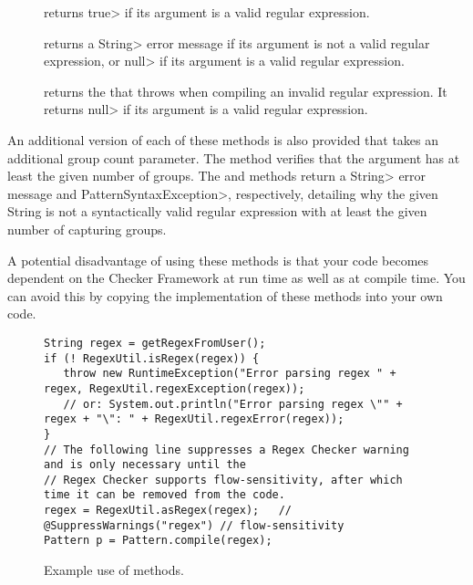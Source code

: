 \begin{description}

\item[]
  returns \<true> if its argument is a valid regular expression.

\item[]
  returns a \<String> error message if its argument is not a valid regular
  expression, or \<null> if its argument is a valid regular expression.

\item[]
  returns the
  that 
  throws when compiling an invalid regular expression.  It returns \<null>
  if its argument is a valid regular expression.

\end{description}

An additional version of each of these methods is also provided that takes
an additional group count parameter. The
 method
verifies that the argument has at least the given number of groups. The
 and
methods return a \<String> error message and \<Pattern\-Syntax\-Exception>,
respectively, detailing why the given String is not a syntactically valid
regular expression with at least the given number of capturing groups.

A potential disadvantage of using these methods is that your code becomes
dependent on the Checker Framework at run time as well as at compile time.
You can avoid this by copying the implementation of these methods into
your own code.

\begin{figure}
\begin{smaller}
\begin{Verbatim}
String regex = getRegexFromUser();
if (! RegexUtil.isRegex(regex)) {
   throw new RuntimeException("Error parsing regex " + regex, RegexUtil.regexException(regex));
   // or: System.out.println("Error parsing regex \"" + regex + "\": " + RegexUtil.regexError(regex));
}
// The following line suppresses a Regex Checker warning and is only necessary until the 
// Regex Checker supports flow-sensitivity, after which time it can be removed from the code.
regex = RegexUtil.asRegex(regex);   // @SuppressWarnings("regex") // flow-sensitivity
Pattern p = Pattern.compile(regex);
\end{Verbatim}
\end{smaller}
\caption{Example use of  methods.}
\label{fig:regex-util-example}
\end{figure}


